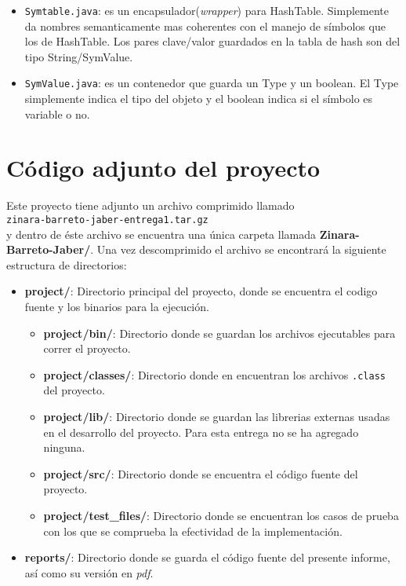 \documentclass[12pt, spanish]{report}
\begin{document}
\begin{itemize}
\item \texttt{Symtable.java}: es un encapsulador(\emph{wrapper}) para
  HashTable. Simplemente da nombres semanticamente mas coherentes con
  el manejo de s\'imbolos que los de HashTable. Los pares clave/valor
  guardados en la tabla de hash son del tipo String/SymValue.

\item \texttt{SymValue.java}: es un contenedor que guarda un Type y un
  boolean. El Type simplemente indica el tipo del objeto y el boolean
  indica si el s\'imbolo es variable o no.
\end{itemize}

\section{C\'odigo adjunto del proyecto}
\label{sec:correr}

Este proyecto tiene adjunto un archivo comprimido llamado\\

\texttt{zinara-barreto-jaber-entrega1.tar.gz}\\

y dentro de \'este archivo se encuentra una \'unica carpeta llamada
\textbf{Zinara-Barreto-Jaber/}. Una vez descomprimido el archivo se
encontrar\'a la siguiente estructura de directorios:

\begin{itemize}
 \item \textbf{project/}: Directorio principal del proyecto, donde se
       encuentra el codigo fuente y los binarios para la ejecuci\'on.
 \begin{itemize}
  \item \textbf{project/bin/}: Directorio donde se guardan los
	archivos ejecutables para correr el proyecto.
  \item \textbf{project/classes/}: Directorio donde en encuentran los
	archivos \texttt{.class} del proyecto.
  \item \textbf{project/lib/}: Directorio donde se guardan las
	librerias externas usadas en el desarrollo del proyecto. Para esta
	entrega no se ha agregado ninguna.
  \item \textbf{project/src/}: Directorio donde se encuentra el c\'odigo
	fuente del proyecto.
  \item \textbf{project/test\_files/}: Directorio donde se encuentran los
	casos de prueba con los que se comprueba la efectividad de la implementaci\'on.
 \end{itemize}
 \item \textbf{reports/}: Directorio donde se guarda el c\'odigo fuente
       del presente informe, as\'i como su versi\'on en \emph{pdf}.
\end{itemize}
\end{document}
